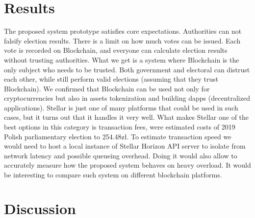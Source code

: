 \documentclass[runningheads]{llncs}
\begin{document}
\section{Results}
The proposed system prototype satisfies core expectations. Authorities can not falsify election results. There is a limit on how much votes can be issued. Each vote is recorded on Blockchain, and everyone can calculate election results without trusting authorities. What we get is a system where Blockchain is the only subject who needs to be trusted. Both government and electoral can distrust each other, while still perform valid elections (assuming that they trust Blockchain). We confirmed that Blockchain can be used not only for cryptocurrencies but also in assets tokenization and building dapps (decentralized applications). Stellar is just one of many platforms that could be used in such cases, but it turns out that it handles it very well. What makes Stellar one of the best options in this category is transaction fees, were estimated costs of 2019 Polish parliamentary election to 254.48zł. To estimate transaction speed we would need to host a local instance of Stellar Horizon API server to isolate from network latency and possible queueing overhead. Doing it would also allow to accurately measure how the proposed system behaves on heavy overload. It would be interesting to compare such system on different blockchain platforms.

\section{Discussion}



\end{document}
